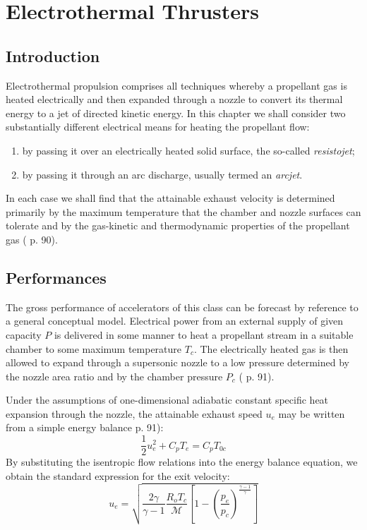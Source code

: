 \section{Electrothermal Thrusters}

\subsection{Introduction}

Electrothermal propulsion comprises all techniques whereby a propellant gas is heated electrically and then expanded through a nozzle to convert its thermal energy to a jet of directed kinetic energy. In this chapter we shall consider two substantially different electrical means for heating the propellant flow:
\begin{enumerate}
    \item by passing it over an electrically heated solid surface, the so-called \textit{resistojet};
    \item by passing it through an arc discharge, usually termed an \textit{arcjet}.
\end{enumerate}
In each case we shall find that the attainable exhaust velocity is determined primarily by the maximum temperature that the chamber and nozzle surfaces can tolerate and by the gas-kinetic and thermodynamic properties of the propellant gas (\cite{pep_book} p. 90).

\subsection{Performances}

The gross performance of accelerators of this class can be forecast by reference to a general conceptual model. Electrical power from an external supply of given capacity $P$ is delivered in some manner to heat a propellant stream in a suitable chamber to some maximum temperature $T_c$. The electrically heated gas is then allowed to expand through a supersonic nozzle to a low pressure determined by the nozzle area ratio and by the chamber pressure $P_c$ (\cite{pep_book} p. 91).

Under the assumptions of one-dimensional adiabatic constant specific heat expansion through the nozzle, the attainable exhaust speed $u_e$ may be written from a simple energy balance \cite{pep_book} p. 91):
\begin{equation}
    \frac{1}{2} u_e^2 + C_p T_e = C_p T_{0c}
\end{equation}
By substituting the isentropic flow relations into the energy balance equation, we obtain the standard expression for the exit velocity:
\begin{equation}
    u_e = \sqrt{\frac{2\gamma}{\gamma-1} \frac{R_o T_c}{\mathcal{M}} \left[ 1 - \left( \frac{p_e}{p_c} \right)^{\frac{\gamma-1}{\gamma}} \right]}
\end{equation}

